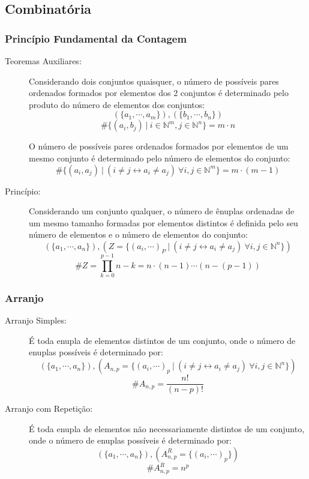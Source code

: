 \subsection{Combinatória}
    \subsubsection{Princípio Fundamental da Contagem}
        \begin{description}
            \item[Teoremas Auxiliares:]
                Considerando dois conjuntos quaisquer, o número de possíveis pares ordenados formados por elementos dos 2 conjuntos é determinado pelo produto do número de elementos dos conjuntos:
                \[ (\{a_1, \cdots, a_m\}), (\{b_1, \cdots, b_n\}) \]
                \[ \#\{ (a_i,b_j) \ | \ i \in \mathbb{N}^m, j \in \mathbb{N}^n \} = m \cdot n \]

                O número de possíveis pares ordenados formados por elementos de um mesmo conjunto é determinado pelo número de elementos do conjunto:
                \[ \#\{ (a_i,a_j) \ | \ (i \neq j \leftrightarrow a_i \neq a_j) \ \forall i,j \in \mathbb{N}^m \} = m \cdot (m-1) \]
            \item[Princípio:]
                Considerando um conjunto qualquer, o número de ênuplas ordenadas de um mesmo tamanho formadas por elementos distintos é definida pelo seu número de elementos e o número de elementos do conjunto:
                \[ (\{a_1, \cdots, a_n\}), (Z = \{ (a_i, \cdots)_P \ | \ (i \neq j \leftrightarrow a_i \neq a_j) \ \forall i,j \in \mathbb{N}^n \}) \]
                \[ \#Z = \displaystyle\prod_{k=0}^{p-1} {n - k} = n \cdot (n-1) \cdots (n - (p - 1)) \]
        \end{description}
    \subsubsection{Arranjo}
        \begin{description}
            \item[Arranjo Simples:]
                É toda enupla de elementos distintos de um conjunto, onde o número de enuplas possíveis é determinado por:
                \[ (\{ a_1, \cdots, a_n \}), (A_{n,p} = \{ (a_i, \cdots)_p \ | \ (i \neq j \leftrightarrow a_i \neq a_j) \ \forall i,j \in \mathbb{N}^n \}) \]
                \[ \#A_{n,p} = \frac{n!}{(n-p)!} \]
            \item[Arranjo com Repetição:]
                É toda enupla de elementos não necessariamente distintos de um conjunto, onde o número de enuplas possíveis é determinado por:
                \[ (\{ a_1, \cdots, a_n \}), (A_{n,p}^R = \{ (a_i, \cdots)_p\}) \]
                \[ \#A_{n,p}^R = n^p \]
        \end{description}

